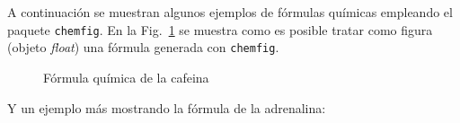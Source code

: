 \documentclass[11pt,a4paper]{article}
\begin{document}
A continuación se muestran algunos ejemplos de fórmulas químicas empleando el paquete \texttt{chemfig}. En la Fig.~\ref{fig:cafeina} se muestra como es posible tratar como figura (objeto \emph{float}) una fórmula generada con \texttt{chemfig}.


\begin{figure}[H]
	\begin{center}
	\end{center}
	\caption{Fórmula química de la cafeina}\label{fig:cafeina}
\end{figure}


Y un ejemplo más mostrando la fórmula de la adrenalina:
\begin{center}
\end{center}
\end{document}
